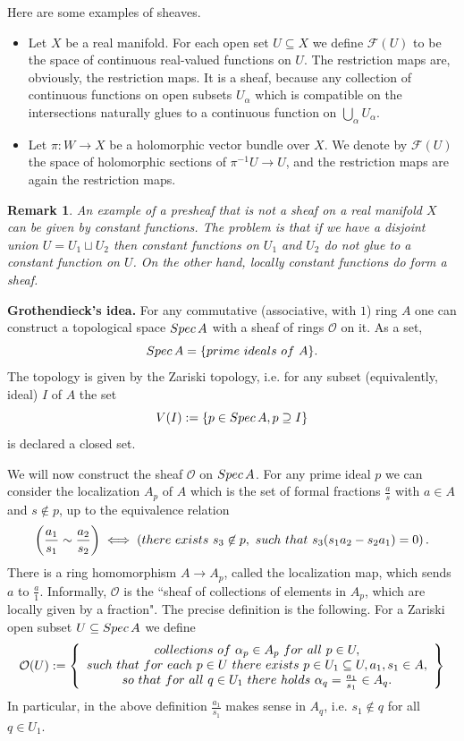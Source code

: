\documentclass[11pt]{article}
\numberwithin{equation}{section}
\numberwithin{footnote}{section}
\newtheorem{rem}[thm]{Remark}
\newcommand{\blue}{\color{blue}}
\begin{document}
\smallskip{\blue \hrule}
Here are some examples of sheaves.
\begin{itemize}
\item Let $X$ be a real manifold. For each open set $U\subseteq X$ we define $\mathcal F(U)$ to be the space of continuous real-valued functions on $U$. The restriction maps are, obviously, the restriction maps. It is a sheaf, because 
any collection of continuous functions on open subsets  $U_\alpha$ which is compatible on the intersections naturally glues to a continuous function on $\bigcup_\alpha U_\alpha$.

\item Let $\pi:W\to X$ be a holomorphic vector bundle over $X$. We denote by $\mathcal F(U)$ the space of holomorphic sections of 
$\pi^{-1}U\to U$, and the restriction maps are again the restriction maps.
\end{itemize}

\smallskip
\begin{rem}
An example of a presheaf that is not a sheaf on a real manifold $X$ can be given by {\blue constant} functions. The problem is that if we have a disjoint union $U=U_1\sqcup U_2$ then constant functions on $U_1$ and $U_2$ do not glue to a constant function on $U$. On the other hand, {\blue locally constant} functions do form a sheaf.
\end{rem}

\smallskip{\blue \hrule}
{\bf Grothendieck's idea.} For any commutative (associative, with $1$) ring $A$ one can construct a topological space ${\rm Spec}\, A$ with a sheaf of rings $\mathcal O$ on it.
As a set, 
$${\rm Spec} \,A= \{{\rm prime~ideals~of~}A\}.
$$
The topology is given by the Zariski topology, i.e. for any subset (equivalently, ideal) $I$ of $A$ the
set 
$$V(I):=\{p\in {\rm Spec} \,A, p\supseteq I\}$$
is declared a closed set.

\smallskip
We will now construct the sheaf $\mathcal O$ on ${\rm Spec}\,A$. For any prime ideal $p$ we can consider the localization $A_p$ of $A$ which is the set of formal fractions $\frac as$ with $a\in A$ and $s\not\in p$, up to the equivalence relation
$$
\left(
\frac {a_1}{s_1} \sim \frac {a_2}{s_2}\right) \iff \left({\rm there~exists~}s_3\not\in p,{\rm~such~that~}s_3(s_1a_2-s_2a_1)=0\right).
$$
There is a ring homomorphism $A\to A_p$, called the localization map,  which sends $a$ to $\frac a1$. 
Informally, $\mathcal O$ is the ``sheaf of collections of elements in $A_p$, which are locally given by a fraction". The precise definition is the following. For a Zariski open subset $U\subseteq {\rm Spec}\,A$ we define
$$
\mathcal O(U):=\left\{
\begin{array}{c}
{\rm collections~of~}\alpha_p\in A_p {\rm ~for~all~}p\in U,\\
{\rm such~that ~for~each~}p\in U~{\rm there~exists~}p\in U_1\subseteq U, a_1,s_1\in A,\\
{\rm so~that~for~all~}q\in U_1~{\rm there~holds~}\alpha_q= \frac {a_1}{s_1}\in A_q.
\end{array}
\right\}
$$
In particular, in the above definition $\frac{a_1}{s_1}$ makes sense in $A_q$, i.e. $s_1\not\in q$ for all $q\in U_1$.
\end{document}
